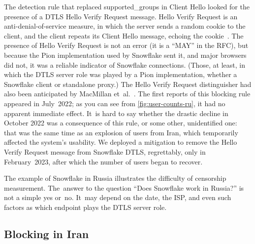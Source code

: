 \documentclass[letterpaper,twocolumn]{article}
\begin{document}
The detection rule that replaced \mbox{supported\_groups} in Client Hello
looked for the presence of a DTLS Hello Verify Request message.
Hello Verify Request is an anti-denial-of-service measure,
in which the server sends a random cookie to the client,
and the client repeats its Client Hello message,
echoing the cookie~\cite[\S 5.1]{rfc9147}.
The presence of Hello Verify Request is not an error
(it is a ``MAY'' in the RFC),
but because the Pion implementation used by Snowflake sent it,
and major browsers did not,
it was a reliable indicator of Snowflake connections.
(Those, at least, in which the DTLS server role was played by a Pion implementation,
whether a Snowflake client or standalone proxy.)
The Hello Verify Request distinguisher had also been anticipated by
MacMillan et~al.~\cite[\S 3]{arxiv.2008.03254}.
The first reports of this blocking rule appeared in July~2022;
as you can see from \autoref{fig:user-counts-ru},
it had no apparent immediate effect.
It~is hard to say whether the drastic decline in October 2022
was a consequence of this rule,
or some other, unidentified one:
that was the same time as an explosion of users from Iran,
which temporarily affected the system's usability.
We deployed a mitigation to remove the Hello Verify Request message
from Snowflake DTLS, regrettably, only in February~2023, %
after which the number of users began to recover.

The example of Snowflake in Russia
illustrates the difficulty of censorship measurement.
The~answer to the question ``Does Snowflake work in Russia?''
is not a simple yes or~no.
It~may depend on the date, the ISP,
and even such factors as which endpoint plays the DTLS server role.

\subsection{Blocking in Iran}
\label{sec:block-ir}

\end{document}
